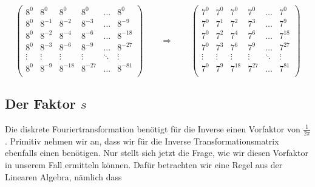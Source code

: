 \[
\begin{pmatrix}
	8^0 & 8^0 & 8^0 & 8^0 & \dots & 8^0 \\
	8^0 & 8^{-1} & 8^{-2} & 8^{-3} & \dots & 8^{-9} \\
	8^0 & 8^{-2} & 8^{-4} & 8^{-6} & \dots & 8^{-18} \\
	8^0 & 8^{-3} & 8^{-6} & 8^{-9} & \dots & 8^{-27} \\
 	\vdots & \vdots & \vdots & \vdots & \ddots & \vdots \\
	8^0 & 8^{-9} & 8^{-18} & 8^{-27} & \dots & 8^{-81} \\
\end{pmatrix}
\qquad
\Rightarrow
\qquad
\begin{pmatrix}
	7^0 & 7^0 & 7^0 & 7^0 & \dots & 7^0 \\
	7^0 & 7^{1} & 7^{2} & 7^{3} & \dots & 7^{9} \\
	7^0 & 7^{2} & 7^{4} & 7^{6} & \dots & 7^{18} \\
	7^0 & 7^{3} & 7^{6} & 7^{9} & \dots & 7^{27} \\
	\vdots & \vdots & \vdots & \vdots & \ddots & \vdots \\
	7^0 & 7^{9} & 7^{18} & 7^{27} & \dots & 7^{81} \\
\end{pmatrix}
\] 

\subsection{Der Faktor $s$
	\label{reedsolomon:subsection:sfaktor}}
Die diskrete Fouriertransformation benötigt für die Inverse einen Vorfaktor von $\frac{1}{2\pi}$.
Primitiv nehmen wir an, dass wir für die Inverse Transformationsmatrix ebenfalls einen benötigen.
Nur stellt sich jetzt die Frage, wie wir diesen Vorfaktor in unserem Fall ermitteln können.
Dafür betrachten wir eine Regel aus der Linearen Algebra, nämlich dass

